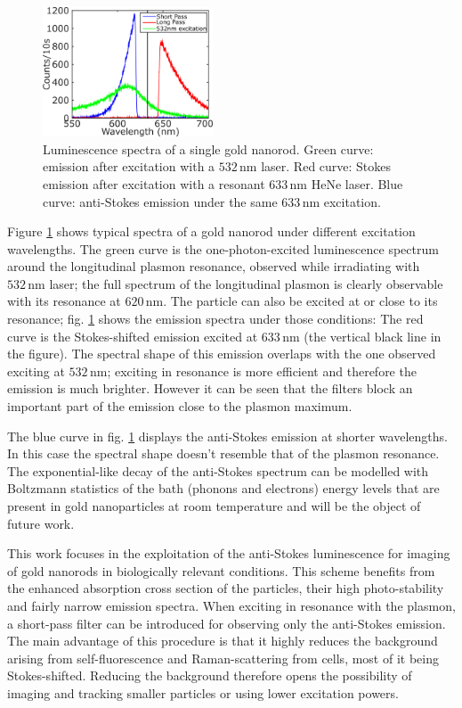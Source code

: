 \documentclass[journal=nalefd,manuscript=letter]{achemso}
\newcommand{\nm}{\ensuremath{\,\textrm{nm}}}
\begin{document}
\begin{figure}[htp] \centering
\includegraphics[width=0.45\textwidth]{Figures/01_3_Curves/3_curves_final.png}
\caption{Luminescence spectra of a single gold nanorod. Green curve: emission
after excitation with a $532\nm$ laser. Red curve: Stokes emission after
excitation with a resonant $633\nm$ HeNe laser. Blue curve: anti-Stokes emission
under the same $633\nm$ excitation.}
	\label{fig:spectra_rod}
\end{figure}

Figure \ref{fig:spectra_rod} shows typical spectra of a gold nanorod under
different excitation wavelengths. The green curve is the one-photon-excited
luminescence spectrum around the longitudinal plasmon resonance, observed while
irradiating with $532\nm$ laser; the full spectrum of the longitudinal plasmon
is clearly observable with its resonance at $620\nm$.
The particle can also be excited at or close to its resonance; fig.
\ref{fig:spectra_rod} shows the emission spectra under those conditions: The red
curve is the Stokes-shifted emission excited at $633\nm$ (the vertical black
line in the figure). The spectral shape of this emission overlaps with the one
observed exciting at $532\nm$; exciting in resonance is more efficient and
therefore the emission is much brighter. However it can be seen that the filters
block an important part of the emission close to the plasmon maximum.

The blue curve in fig. \ref{fig:spectra_rod} displays the anti-Stokes emission
at shorter wavelengths. In this case the spectral shape doesn't resemble that of
the plasmon resonance. The exponential-like decay of the anti-Stokes spectrum
can be modelled with Boltzmann statistics\cite{He2015} of the bath (phonons and
electrons) energy levels that are present in gold nanoparticles at room
temperature and will be the object of future work. 
 
This work focuses in the exploitation of the anti-Stokes
luminescence\cite{Jiang2013} for imaging of gold nanorods in biologically
relevant conditions. This scheme benefits from the enhanced absorption cross
section of the particles, their high photo-stability and fairly narrow emission
spectra. When exciting in resonance with the plasmon, a short-pass
filter can be introduced for observing only the anti-Stokes emission. The main
advantage of this procedure is that it highly reduces the background arising
from self-fluorescence and Raman-scattering from cells, most of it being
Stokes-shifted. Reducing the background therefore opens the possibility of
imaging and tracking smaller particles or using lower excitation powers.
\end{document}
